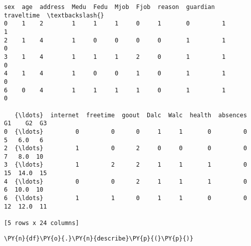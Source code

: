             \begin{tcolorbox}[breakable, size=fbox, boxrule=.5pt, pad at break*=1mm, opacityfill=0]
\begin{Verbatim}[commandchars=\\\{\}]
   sex  age  address  Medu  Fedu  Mjob  Fjob  reason  guardian  traveltime  \textbackslash{}
0    1    2        1     1     1     0     1       0         1           1
2    1    4        1     0     0     0     0       1         1           0
3    1    4        1     1     1     2     0       1         1           0
4    1    4        1     0     0     1     0       1         1           0
6    0    4        1     1     1     1     0       1         1           0

   {\ldots}  internet  freetime  goout  Dalc  Walc  health  absences  G1    G2  G3
0  {\ldots}         0         0      0     1     1       0         0   5   6.0   6
2  {\ldots}         1         0      2     0     0       0         0   7   8.0  10
3  {\ldots}         1         2      2     1     1       1         0  15  14.0  15
4  {\ldots}         0         0      2     1     1       1         0   6  10.0  10
6  {\ldots}         1         1      0     1     1       0         0  12  12.0  11

[5 rows x 24 columns]
\end{Verbatim}
\end{tcolorbox}
        
    \begin{tcolorbox}[breakable, size=fbox, boxrule=1pt, pad at break*=1mm,colback=cellbackground, colframe=cellborder]
\begin{Verbatim}[commandchars=\\\{\}]
\PY{n}{df}\PY{o}{.}\PY{n}{describe}\PY{p}{(}\PY{p}{)}
\end{Verbatim}
\end{tcolorbox}

